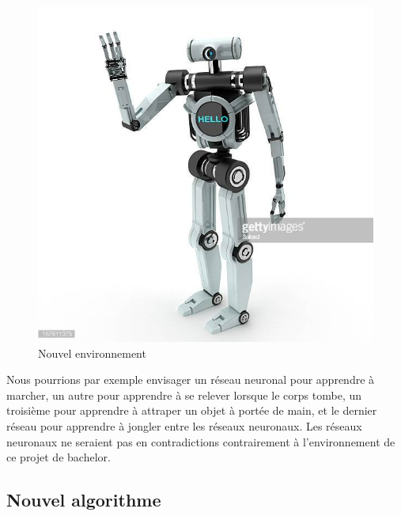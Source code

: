 \documentclass[11pt,a4paper]{report}
\begin{document}
   \begin{figure}[!h]
   \center
   \includegraphics[scale=1]{ressources/robot.jpg}
   \caption{Nouvel environnement}
   \end{figure} 
   
   \par Nous pourrions par exemple envisager un réseau neuronal pour apprendre à marcher, un autre pour apprendre à se relever lorsque le corps tombe, un troisième pour apprendre à attraper un objet à portée de main, et le dernier réseau pour apprendre à jongler entre les réseaux neuronaux. Les réseaux neuronaux ne seraient pas en contradictions contrairement à l'environnement de ce projet de bachelor. 
   
  \subsection{Nouvel algorithme}
  
\end{document}
